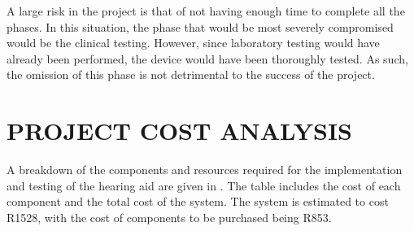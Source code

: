 \documentclass[10pt,twocolumn]{witseiepaper}
\begin{document}
A large risk in the project is that of not having enough time to complete all the phases. In this situation, the phase that would be most severely compromised would be the clinical testing. However, since laboratory testing would have already been performed, the device would have been thoroughly tested. As such, the omission of this phase is not detrimental to the success of the project.

\section{PROJECT COST ANALYSIS}
A breakdown of the components and resources required for the implementation and testing of the hearing aid are given in . The table includes the cost of each component and the total cost of the system. The system is estimated to cost R1528, with the cost of components to be purchased being R853.
\end{document}
